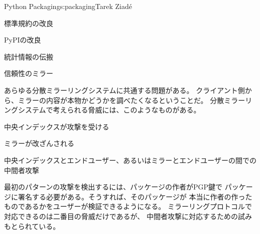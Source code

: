 \begin{aosachapter}{Python Packaging}{s:packaging}{Tarek Ziad\'{e}}
\begin{aosasect1}{標準規約の改良}
\begin{aosasect2}{PyPIの改良}
\begin{aosasect3}{統計情報の伝搬}
\end{aosasect3}

\begin{aosasect3}{信頼性のミラー}

あらゆる分散ミラーリングシステムに共通する問題がある。
クライアント側から、ミラーの内容が本物かどうかを調べたくなるということだ。
分散ミラーリングシステムで考えられる脅威には、このようなものがある。

\begin{aosaitemize}

  \item 中央インデックスが攻撃を受ける

  \item ミラーが改ざんされる

  \item 中央インデックスとエンドユーザー、あるいはミラーとエンドユーザーの間での中間者攻撃

\end{aosaitemize}

\noindent
最初のパターンの攻撃を検出するには、パッケージの作者がPGP鍵で
パッケージに署名する必要がある。そうすれば、そのパッケージが
本当に作者の作ったものであるかをユーザーが検証できるようになる。
ミラーリングプロトコルで対応できるのは二番目の脅威だけであるが、
中間者攻撃に対応するための試みもとられている。


\end{aosasect3}
\end{aosasect2}
\end{aosasect1}
\end{aosachapter}
